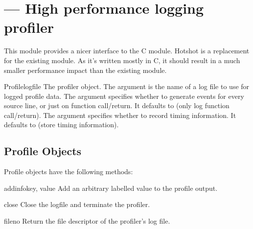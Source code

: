 \section{ ---
         High performance logging profiler}




This module provides a nicer interface to the  C module.
Hotshot is a replacement for the existing  module. As it's
written mostly in C, it should result in a much smaller performance impact
than the existing  module.

\begin{classdesc}{Profile}{logfile}
The profiler object. The argument  is the name of a log
file to use for logged profile data. The argument 
specifies whether to generate events for every source line, or just on
function call/return. It defaults to  (only log function
call/return). The argument  specifies whether to
record timing information. It defaults to  (store timing
information).
\end{classdesc}


\subsection{Profile Objects \label{hotshot-objects}}

Profile objects have the following methods:

\begin{methoddesc}{addinfo}{key, value}
Add an arbitrary labelled value to the profile output.
\end{methoddesc}

\begin{methoddesc}{close}{}
Close the logfile and terminate the profiler.
\end{methoddesc}

\begin{methoddesc}{fileno}{}
Return the file descriptor of the profiler's log file.
\end{methoddesc}

